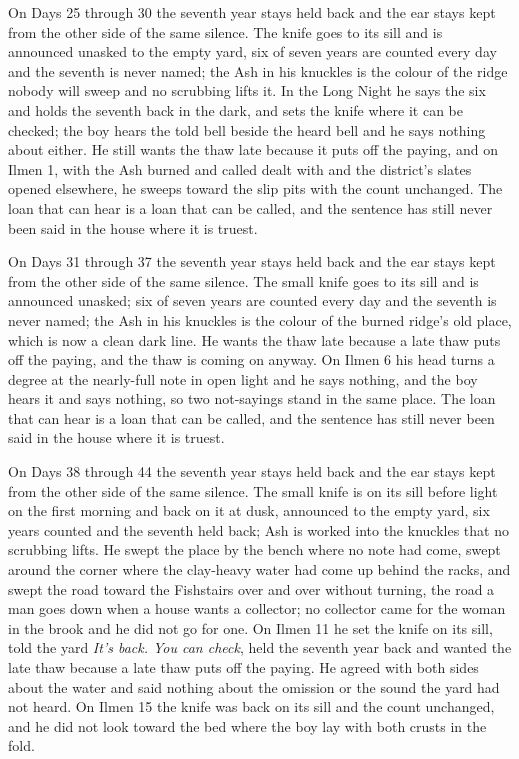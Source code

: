 \documentclass{design/chronicle}
\begin{document}
{On Days 25 through 30 the seventh year stays held back and the ear stays kept from the other side of the same silence. The knife goes to its sill and is announced unasked to the empty yard, six of seven years are counted every day and the seventh is never named; the Ash in his knuckles is the colour of the ridge nobody will sweep and no scrubbing lifts it. In the Long Night he says the six and holds the seventh back in the dark, and sets the knife where it can be checked; the boy hears the told bell beside the heard bell and he says nothing about either. He still wants the thaw late because it puts off the paying, and on Ilmen 1, with the Ash burned and called dealt with and the district’s slates opened elsewhere, he sweeps toward the slip pits with the count unchanged. The loan that can hear is a loan that can be called, and the sentence has still never been said in the house where it is truest.

On Days 31 through 37 the seventh year stays held back and the ear stays kept from the other side of the same silence. The small knife goes to its sill and is announced unasked; six of seven years are counted every day and the seventh is never named; the Ash in his knuckles is the colour of the burned ridge’s old place, which is now a clean dark line. He wants the thaw late because a late thaw puts off the paying, and the thaw is coming on anyway. On Ilmen 6 his head turns a degree at the nearly-full note in open light and he says nothing, and the boy hears it and says nothing, so two not-sayings stand in the same place. The loan that can hear is a loan that can be called, and the sentence has still never been said in the house where it is truest.

On Days 38 through 44 the seventh year stays held back and the ear stays kept from the other side of the same silence. The small knife is on its sill before light on the first morning and back on it at dusk, announced to the empty yard, six years counted and the seventh held back; Ash is worked into the knuckles that no scrubbing lifts. He swept the place by the bench where no note had come, swept around the corner where the clay-heavy water had come up behind the racks, and swept the road toward the Fishstairs over and over without turning, the road a man goes down when a house wants a collector; no collector came for the woman in the brook and he did not go for one. On Ilmen 11 he set the knife on its sill, told the yard \emph{It’s back. You can check}, held the seventh year back and wanted the late thaw because a late thaw puts off the paying. He agreed with both sides about the water and said nothing about the omission or the sound the yard had not heard. On Ilmen 15 the knife was back on its sill and the count unchanged, and he did not look toward the bed where the boy lay with both crusts in the fold.

}
\end{document}
